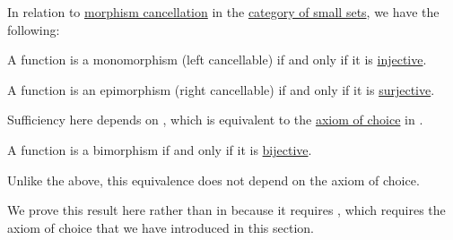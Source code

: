 \begin{proposition}\label{thm:function_cancellation_categorical}
  In relation to \hyperref[def:morphism_cancellation]{morphism cancellation} in the \hyperref[def:category_of_small_sets]{category of small sets}, we have the following:
  \begin{thmenum}
     A function is a monomorphism (left cancellable) if and only if it is \hyperref[def:function_invertibility/injective]{injective}.

     A function is an epimorphism (right cancellable) if and only if it is \hyperref[def:function_invertibility/surjective]{surjective}.

    Sufficiency here depends on , which is equivalent to the \hyperref[def:zfc/choice]{axiom of choice} in \hyperref[def:zfc]{}.

     A function is a bimorphism if and only if it is \hyperref[def:function_invertibility/bijective]{bijective}.

    Unlike the above, this equivalence does not depend on the axiom of choice.
  \end{thmenum}
\end{proposition}
\begin{comments}
  \item We prove this result here rather than in  because it requires , which requires the axiom of choice that we have introduced in this section.
\end{comments}
